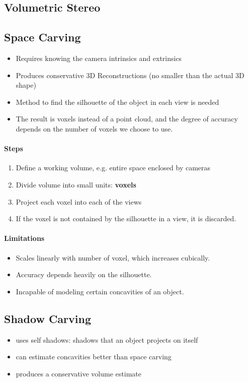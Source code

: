 \documentclass[8pt, a4paper, landscape, includeheadfoot]{extarticle}
\begin{document}
\begin{multicols*}{4}
	\section{Volumetric Stereo}

	\subsection{Space Carving}

	\begin{itemize}[itemsep=0pt, leftmargin=8pt]
		\item Requires knowing the camera intrinsics and extrinsics
		\item Produces conservative 3D Reconstructions (no smaller than the actual 3D shape)
		\item Method to find the silhouette of the object in each view is needed
		\item The result is voxels instead of a point cloud, and the degree of accuracy depends on the number of voxels we choose to use.
	\end{itemize}
	\paragraph{Steps}
	\begin{enumerate}[itemsep=0pt, leftmargin=8pt]
		\item Define a working volume, e.g. entire space enclosed by cameras
		\item Divide volume into small units: \textbf{voxels}
		\item Project each voxel into each of the views
		\item If the voxel is not contained by the silhouette in a view, it is discarded.
	\end{enumerate}
	\paragraph{Limitations}
	\begin{itemize}[itemsep=0pt, leftmargin=8pt]
		\item Scales linearly with number of voxel, which increases cubically.
		\item Accuracy depends heavily on the silhouette.
		\item Incapable of modeling certain concavities of an object.
	\end{itemize}

	\subsection{Shadow Carving}
	\begin{itemize}[itemsep=0pt, leftmargin=8pt]
		\item uses self shadows: shadows that an object projects on itself
		\item can estimate concavities better than space carving
		\item produces a conservative volume estimate
	\end{itemize}

\end{multicols*}
\end{document}
